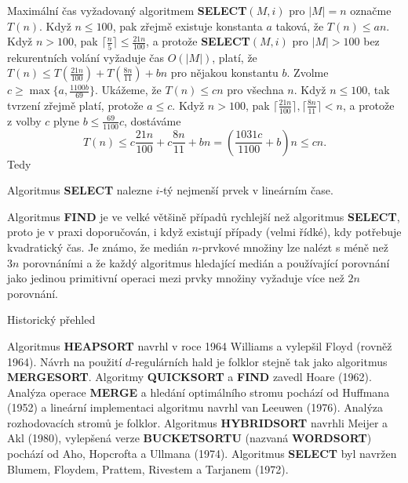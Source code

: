 \documentclass[a4paper,12pt]{article}
\begin{document}
Maximální čas vyžadovaný algoritmem  
{\bf SELECT$(M,i)$} pro $|M|=n$ označme $T(n)$.  Když $n\le 
100$, pak zřejmě 
exis\-tuje konstanta $a$ taková, že $T(n)\le an$.  Když $
n>100$, 
pak $\lceil\frac n5\rceil\le\frac {21n}{100}$, a protože {\bf SELECT$
(M,i)$} pro $|M|>100$ bez 
rekurentních volání vyžaduje čas $O(|M|)$, platí, že $
T(n)\le T(\frac {21n}{100})+T(\frac {8n}{11})+bn$ pro nějakou konstantu 
$b$.  Zvolme $c\ge\max\{a,\frac {1100b}{69}\}$. Ukážeme, že $
T(n)\le cn$ pro 
všechna $n$.  
Když $n\le 100$, tak tvrzení zřejmě platí, protože $
a\le c$.  Když 
$n>100$, pak $\lceil\frac {21n}{100}\rceil ,\lceil\frac {8n}{11}\rceil 
<n$, a protože z volby $c$ plyne 
$b\le\frac {69}{1100}c$, 
dostáváme 
$$T(n)\le c\frac {21n}{100}+c\frac {8n}{11}+bn=(\frac {1031c}{110
0}+b)n\le cn.$$
Tedy

\begin{veta}Algoritmus {\bf SELECT} nalezne $i$-tý nejmenší 
prvek v lineárním čase.
\end{veta}

Algoritmus {\bf FIND} je ve velké většině 
případů 
rychlejší než algoritmus {\bf SELECT}, proto je v praxi 
doporučován, i když existují 
případy (velmi řídké), kdy potřebuje kvadratický čas.
Je známo, že medián $n$-prvkové množiny lze nalézt s 
méně než $3n$ porovnáními a že každý algoritmus hledající 
medián a používající porovnání jako jedinou primitivní 
operaci mezi prvky množiny vyžaduje více než $2n$ 
porovnání.

\head
Historický přehled
\endhead

Algoritmus {\bf HEAPSORT }
navrhl v roce 1964 Williams a vylepšil Floyd (rovněž 1964).  Návrh 
na použití $d$-regulár\-ních hald je folklor stejně tak jako  
algoritmus {\bf MER\-GESORT}.  Algoritmy {\bf QUICKSORT} a {\bf FIND }
zavedl Hoare (1962).  Analýza ope\-race {\bf MERGE} a 
hledání optimálního stro\-mu pochází od Huffmana 
(1952) a lineární implementaci algoritmu navrhl van 
Leeuwen (1976).  Analýza rozhodovacích stromů je 
folklor. Algoritmus {\bf HYBRIDSORT} navrhli Meijer a Akl (1980), 
vylepše\-ná verze {\bf BUCKETSORTU} (nazvaná {\bf WORDSORT}) 
pochází od Aho, Hopcrofta a Ullmana (1974). Algoritmus {\bf SELECT} byl 
navržen Blumem, Floydem, Prattem, Rivestem a 
Tarjanem (1972).  
\end{document}
